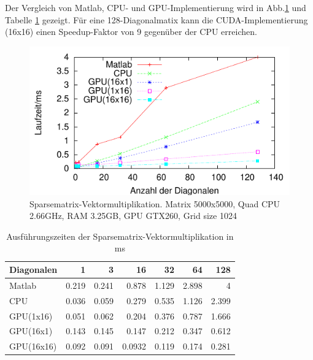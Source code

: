 


Der Vergleich von Matlab, CPU- und GPU-Implementierung wird in
Abb.\ref{sparse_ergebnis} und Tabelle \ref{tab_sparse_result} gezeigt.
Für eine 128-Diagonalmatix kann die CUDA-Implementierung (16x16)
einen Speedup-Faktor von 9 gegenüber der CPU erreichen.


\begin{figure}[htbp]
\includegraphics{../ausarbeitung/sparse/sparsegp.pdf}
\caption{Sparsematrix-Vektormultiplikation. Matrix 5000x5000, Quad CPU 2.66GHz, RAM 3.25GB, GPU GTX260, Grid size 1024}
\label{sparse_ergebnis}
\end{figure}


\begin{table}
\renewcommand{\arraystretch}{1.3}
\caption{Ausführungszeiten der Sparsematrix-Vektormultiplikation in ms}
\label{tab_sparse_result}
\centering
\begin{tabular}{|l|r|r|r|r|r|r|}

\hline
Diagonalen& 1& 3& 16& 32& 64 &128\\


\hline
\hline
Matlab     &   0.219   &   0.241&   0.878  &  1.129 &  2.898  & 4\\
CPU        & 	0.036 &   0.059& 	0.279  &  0.535 &  1.126  & 2.399 \\
GPU(1x16)  & 0.051     &   0.062 &  0.204  &  0.376 &  0.787  & 1.666\\
GPU(16x1)  & 0.143     &	0.145 &	0.147  &  0.212 &	0.347 &	0.612\\

GPU(16x16)     & 0.092 &	0.091  &	0.0932 &	0.119&	0.174 &	0.281\\

\hline
\end{tabular}
\end{table}